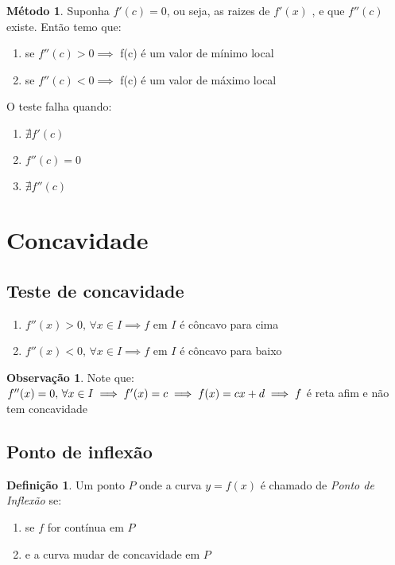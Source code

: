 \documentclass[14pt]{extreport}
\theoremstyle{definition}
\newtheorem{definition}{Definição}
\newtheorem*{remark}{Observação}
\newtheorem{method}{Método}
\begin{document}
\begin{method}
    Suponha \(f'(c) = 0\), ou seja, as raizes de \(f'(x)\) , e que \(f''(c)\) existe. Então temo que:
    
    \begin{enumerate}
        \item se \(f''(c) > 0 \implies\) f(c) é um valor de mínimo local
        \item se \(f''(c) < 0 \implies\) f(c) é um valor de máximo local
    \end{enumerate}    
\end{method}
O teste falha quando:
\begin{enumerate}
    \item \(\nexists f'(c)\)
    \item \(f''(c) = 0\)
    \item \(\nexists f''(c)\)
\end{enumerate}

\section{Concavidade}

\subsection{Teste de concavidade}

\begin{enumerate}
    \item \(f''(x) > 0,\, \forall x \in I \implies f\) em \(I\) é côncavo para cima
    \item \(f''(x) < 0,\, \forall x \in I \implies f\) em \(I\) é côncavo para baixo
\end{enumerate}

\begin{remark}
    Note que:\\
    \(f''(x) = 0,\, \forall x \in I \\
    \implies f'(x) = c \\
    \implies f(x) = cx + d \\ 
    \implies f\) é reta afim e não tem concavidade
\end{remark}

\subsection{Ponto de inflexão}

\begin{definition}
    Um ponto \(P\) onde a curva \(y = f(x)\) é chamado de \textit{Ponto de Inflexão} se:
    \begin{enumerate}
        \item se \(f\) for contínua em \(P\)
        \item e a curva mudar de concavidade em \(P\)
    \end{enumerate}
\end{definition}
\end{document}
